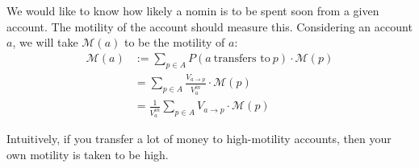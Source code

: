 \documentclass{article}
\begin{document}
\noindent We would like to know how likely a nomin is to be spent soon from a given account.
The motility of the account should measure this. Considering an account \(a\), we will take
\(\mathcal{M}(a)\) to be the motility of \(a\):
\begin{align*}
    \mathcal{M}(a) &:= \sum_{p \in A}{P(a \ \text{transfers to} \ p) \cdot \mathcal{M}(p)} \\
    &= \sum_{p \in A}{\frac{V_{a \rightarrow p}}{V_{a}^{in}} \cdot \mathcal{M}(p)} \\
    &= \frac{1}{V_{a}^{in}} \sum_{p \in A}{V_{a \rightarrow p} \cdot \mathcal{M}(p)}
\end{align*}

Intuitively, if you transfer a lot of money to high-motility accounts, then your own motility is
taken to be high.
\end{document}
